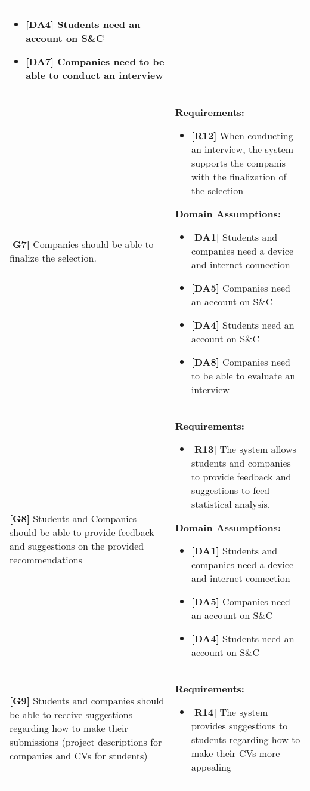 \begin{longtable}{|p{}|p{}|}
\begin{itemize}
    \item \textbf{[DA4]} Students need an account on S\&C
    \item \textbf{[DA7]} Companies need to be able to conduct an interview
\end{itemize} \\
\hline
\textbf{[G7]} Companies should be able to finalize the selection. 
& 
\textbf{Requirements:}
\begin{itemize}
    \item \textbf{[R12]} When conducting an interview, the system supports the companis with the finalization of the selection
\end{itemize}
\textbf{Domain Assumptions:}
\begin{itemize}
    \item \textbf{[DA1]} Students and companies need a device and internet connection
    \item \textbf{[DA5]} Companies need an account on S\&C
    \item \textbf{[DA4]} Students need an account on S\&C
    \item \textbf{[DA8]} Companies need to be able to evaluate an interview
\end{itemize} \\
\hline
\textbf{[G8]} Students and Companies should be able to provide feedback and suggestions on the provided recommendations
& 
\textbf{Requirements:}
\begin{itemize}
    \item \textbf{[R13]} The system allows students and companies to provide feedback and suggestions to feed statistical analysis.
\end{itemize}
\textbf{Domain Assumptions:}
\begin{itemize}
    \item \textbf{[DA1]} Students and companies need a device and internet connection
    \item \textbf{[DA5]} Companies need an account on S\&C
    \item \textbf{[DA4]} Students need an account on S\&C
\end{itemize} \\
\hline
\textbf{[G9]} Students and companies should be able to receive suggestions regarding how to make their submissions (project descriptions for companies and CVs for students)
& 
\textbf{Requirements:}
\begin{itemize}
    \item \textbf{[R14]} The system provides suggestions to students regarding how to make their CVs more appealing

\end{itemize}
\end{longtable}
